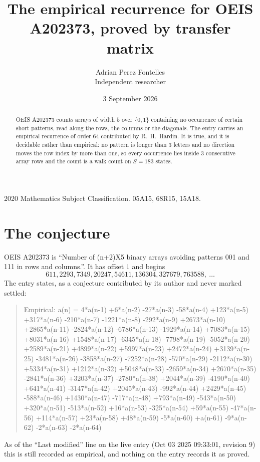\documentclass[11pt,a4paper]{article}
\title{The empirical recurrence for OEIS A202373, proved by transfer matrix}
\author{Adrian Perez Fontelles\\ \small Independent researcher}
\date{3 September 2026}
\theoremstyle{plain}
\theoremstyle{definition}
\begin{document}
\maketitle

\begin{abstract}
OEIS A202373 counts arrays of width $5$ over $\{0,1\}$ containing no occurrence of certain short
patterns, read along the rows, the columns or the diagonals. The entry carries an empirical
recurrence of order $64$ contributed by R.~H.~Hardin. It is true, and it is decidable
rather than empirical: no pattern is longer than $3$ letters and no direction moves the row
index by more than one, so every occurrence lies inside $3$ consecutive array rows and the
count is a walk count on $S=183$ states.
\end{abstract}

\noindent\small 2020 Mathematics Subject Classification. 05A15, 68R15, 15A18.\normalsize

\section{The conjecture}

OEIS A202373 is ``Number of (n+2)X5 binary arrays avoiding patterns 001 and 111 in rows and columns.''. It has offset $1$ and begins
\[
611, 2293, 7349, 20247, 54611, 136304, 327679, 763588,\ \dots
\]
The entry states, as a conjecture contributed by its author and never marked settled:
\begin{quote}
Empirical: a(n) = 4*a(n-1) +6*a(n-2) -27*a(n-3) -58*a(n-4) +123*a(n-5) +317*a(n-6) -210*a(n-7) -1221*a(n-8) -292*a(n-9) +2673*a(n-10) +2865*a(n-11) -2824*a(n-12) -6786*a(n-13) -1929*a(n-14) +7083*a(n-15) +8031*a(n-16) +1548*a(n-17) -6345*a(n-18) -7798*a(n-19) -5052*a(n-20) +2589*a(n-21) +4899*a(n-22) +5997*a(n-23) +2472*a(n-24) +3139*a(n-25) -3481*a(n-26) -3858*a(n-27) -7252*a(n-28) -570*a(n-29) -2112*a(n-30) +5334*a(n-31) +1212*a(n-32) +5048*a(n-33) -2659*a(n-34) +2670*a(n-35) -2841*a(n-36) +3203*a(n-37) -2780*a(n-38) +2044*a(n-39) -4190*a(n-40) +641*a(n-41) -3147*a(n-42) +2045*a(n-43) -992*a(n-44) +2429*a(n-45) -588*a(n-46) +1430*a(n-47) -717*a(n-48) +793*a(n-49) -543*a(n-50) +320*a(n-51) -513*a(n-52) +16*a(n-53) -325*a(n-54) +59*a(n-55) -47*a(n-56) +114*a(n-57) +23*a(n-58) +48*a(n-59) -5*a(n-60) +a(n-61) -9*a(n-62) -2*a(n-63) -2*a(n-64)
\end{quote}
As of the ``Last modified'' line on the live entry (Oct 03 2025 09:33:01, revision 9) this is still
recorded as empirical, and nothing on the entry records it as proved.
\end{document}
